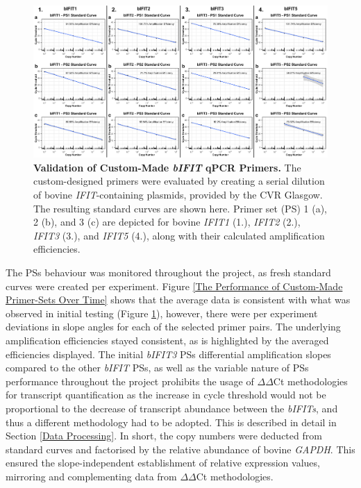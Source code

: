 \begin{figure}
    \centering
    \includegraphics[width=1\linewidth]{07. Chapter 2/Figs/01. Technologies/02. primer validation.pdf}
    \caption[Validation of Custom-Made \textit{bIFIT} qPCR Primers.]{\textbf{Validation of Custom-Made \textit{bIFIT} qPCR Primers.} The custom-designed primers were evaluated by creating a serial dilution of bovine \textit{IFIT}-containing plasmids, provided by the CVR Glasgow. The resulting standard curves are shown here. Primer set (PS) 1 (a), 2 (b), and 3 (c) are depicted for bovine \textit{IFIT1} (1.), \textit{IFIT2} (2.), \textit{IFIT3} (3.), and \textit{IFIT5} (4.), along with their calculated amplification efficiencies.}
    \label{Validation of custom-made bIFIT qPCR primers}
\end{figure}

The PSs behaviour was monitored throughout the project, as fresh standard curves were created per experiment. Figure \ref{The Performance of Custom-Made Primer-Sets Over Time} shows that the average data is consistent with what was observed in initial testing (Figure \ref{Validation of custom-made bIFIT qPCR primers}), however, there were per experiment deviations in slope angles for each of the selected primer pairs. The underlying amplification efficiencies stayed consistent, as is highlighted by the averaged efficiencies displayed. The initial \textit{bIFIT3} PSs differential amplification slopes compared to the other \textit{bIFIT} PSs, as well as the variable nature of PSs performance throughout the project prohibits the usage of \(\Delta\)\(\Delta\)Ct methodologies for transcript quantification as the increase in cycle threshold would not be proportional to the decrease of transcript abundance between the \textit{bIFITs}, and thus a different methodology had to be adopted. This is described in detail in Section \ref{Data Processing}. In short, the copy numbers were deducted from standard curves and factorised by the relative abundance of bovine \textit{GAPDH}. This ensured the slope-independent establishment of relative expression values, mirroring and complementing data from \(\Delta\)\(\Delta\)Ct methodologies.

